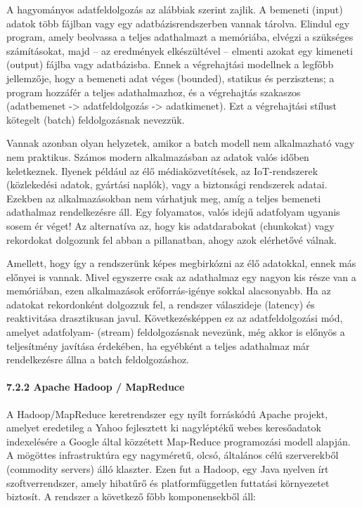 \documentclass[
]{article}
\begin{document}
A hagyományos adatfeldolgozás az alábbiak szerint zajlik. A bemeneti
(input) adatok több fájlban vagy egy adatbázisrendszerben vannak
tárolva. Elindul egy program, amely beolvassa a teljes adathalmazt a
memóriába, elvégzi a szükséges számításokat, majd -- az eredmények
elkészültével -- elmenti azokat egy kimeneti (output) fájlba vagy
adatbázisba. Ennek a végrehajtási modellnek a legfőbb jellemzője, hogy a
bemeneti adat véges (bounded), statikus és perzisztens; a program
hozzáfér a teljes adathalmazhoz, és a végrehajtás szakaszos (adatbemenet
-\textgreater{} adatfeldolgozás -\textgreater{} adatkimenet). Ezt a
végrehajtási stílust kötegelt (batch) feldolgozásnak nevezzük.

Vannak azonban olyan helyzetek, amikor a batch modell nem alkalmazható
vagy nem praktikus. Számos modern alkalmazásban az adatok valós időben
keletkeznek. Ilyenek például az élő médiaközvetítések, az IoT-rendszerek
(közlekedési adatok, gyártási naplók), vagy a biztonsági rendszerek
adatai. Ezekben az alkalmazásokban nem várhatjuk meg, amíg a teljes
bemeneti adathalmaz rendelkezésre áll. Egy folyamatos, valós idejű
adatfolyam ugyanis sosem ér véget! Az alternatíva az, hogy kis
adatdarabokat (chunkokat) vagy rekordokat dolgozunk fel abban a
pillanatban, ahogy azok elérhetővé válnak.

Amellett, hogy így a rendszerünk képes megbirkózni az élő adatokkal,
ennek más előnyei is vannak. Mivel egyszerre csak az adathalmaz egy
nagyon kis része van a memóriában, ezen alkalmazások erőforrás-igénye
sokkal alacsonyabb. Ha az adatokat rekordonként dolgozzuk fel, a
rendszer válaszideje (latency) és reaktivitása drasztikusan javul.
Következésképpen ez az adatfeldolgozási mód, amelyet adatfolyam-
(stream) feldolgozásnak nevezünk, még akkor is előnyös a teljesítmény
javítása érdekében, ha egyébként a teljes adathalmaz már rendelkezésre
állna a batch feldolgozáshoz.

\hypertarget{apache-hadoop-mapreduce}{%
\paragraph{7.2.2 Apache Hadoop /
MapReduce}\label{apache-hadoop-mapreduce}}

A Hadoop/MapReduce keretrendszer egy nyílt forráskódú Apache projekt,
amelyet eredetileg a Yahoo fejlesztett ki nagyléptékű webes keresőadatok
indexelésére a Google által közzétett Map-Reduce programozási modell
alapján. A mögöttes infrastruktúra egy nagyméretű, olcsó, általános célú
szerverekből (commodity servers) álló klaszter. Ezen fut a Hadoop, egy
Java nyelven írt szoftverrendszer, amely hibatűrő és platformfüggetlen
futtatási környezetet biztosít. A rendszer a következő főbb
komponensekből áll:
\end{document}
